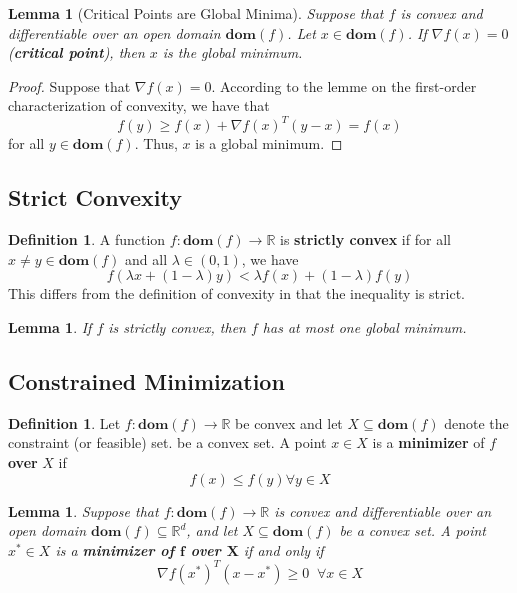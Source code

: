 \documentclass[10pt]{article}
\newcommand{\R}{\mathbb{R}}
\newcommand{\domain}[1]{\mathbf{dom}(#1)}
\newtheorem{lemma}[theorem]{Lemma}
\theoremstyle{remark}
\theoremstyle{definition}
\newtheorem{definition}[theorem]{Definition}
\begin{document}
\begin{lemma}[Critical Points are Global Minima]
Suppose that $f$ is convex and differentiable over an open domain $\domain{f}$.
Let $x \in \domain{f}$. If $\nabla f(x) =0$ (\textbf{critical point}), then 
$x$ is the global minimum.
\end{lemma}
\begin{proof}
Suppose that $\nabla f(x) =0$. According to the lemme on the 
first-order characterization of convexity, we have that
\[ f(y) \geq f(x) + \nabla f(x)^T(y-x) = f(x) \]
\noindent for all $y \in \domain{f}$. Thus, $x$ is a global minimum.
\end{proof}

\subsection{Strict Convexity}
\begin{definition}
	A function $f: \domain{f} \to \R$ is \textbf{strictly convex} if 
	for all $x \neq y \in \domain{f}$ and all $\lambda \in (0,1)$, we have
	\begin{equation}
		f(\lambda x + (1-\lambda)y) < \lambda f(x) + (1-\lambda)f(y)
	\end{equation}
	This differs from the definition of convexity in that the inequality is strict.
\end{definition}
\begin{lemma}
	If $f$ is strictly convex, then $f$ has at most one global minimum.
\end{lemma}
\subsection{Constrained Minimization}
\begin{definition}
	Let $f: \domain{f} \to \R$ be convex and let $X \subseteq \domain{f}$ denote 
	the constraint (or feasible) set.  
	be a convex set. A point $x \in X$ is a \textbf{minimizer} of $f$  \textbf{over} $X$ if 
	\[ f(x) \leq f(y) \forall y \in X \]
\end{definition}
\begin{lemma}
	Suppose that $f: \domain{f} \to \R$ is convex and differentiable over 
	an open domain $\domain{f} \subseteq \R^d$, and let $X \subseteq \domain{f}$ 
	be a convex set. A point $x^* \in X$ is a \textbf{minimizer of $\mathbf{f}$ over $\mathbf{X}$} if and only if
	\begin{equation}
		\nabla f(x^*)^T(x-x^*) \geq 0 \; \; \forall x \in X
	\end{equation}
\end{lemma}
\end{document}
